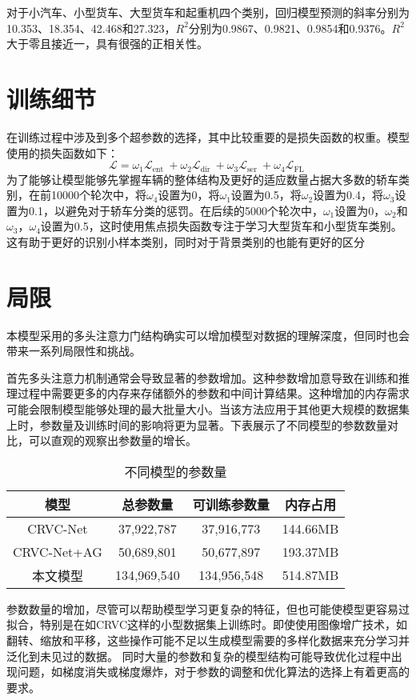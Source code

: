   对于小汽车、小型货车、大型货车和起重机四个类别，回归模型预测的斜率分别为10.353、18.354、42.468和27.323，\(R^2\)分别为0.9867、0.9821、0.9854和0.9376。\(R^2\)大于零且接近一，具有很强的正相关性。

\section{训练细节}
在训练过程中涉及到多个超参数的选择，其中比较重要的是损失函数的权重。模型使用的损失函数如下：
\begin{equation}
    \mathcal{L}=\omega_1\mathcal{L}_{\text {ent }}+\omega_2\mathcal{L}_{\text {dir }}+\omega_3\mathcal{L}_{\text {ser }}
    +\omega_4\mathcal{L}_{\text {FL }}
\end{equation}
为了能够让模型能够先掌握车辆的整体结构及更好的适应数量占据大多数的轿车类别，在前10000个轮次中，将\(\omega_4\)设置为0，将\(\omega_1\)设置为0.5，将\(\omega_2\)设置为0.4，将\(\omega_3\)设置为0.1，以避免对于轿车分类的惩罚。在后续的5000个轮次中，\(\omega_1\)设置为0，\(\omega_2\)和\(\omega_3\)，\(\omega_4\)设置为0.5，这时使用焦点损失函数专注于学习大型货车和小型货车类别。这有助于更好的识别小样本类别，同时对于背景类别的也能有更好的区分


\section{局限}
本模型采用的多头注意力门结构确实可以增加模型对数据的理解深度，但同时也会带来一系列局限性和挑战。

首先多头注意力机制通常会导致显著的参数增加。这种参数增加意导致在训练和推理过程中需要更多的内存来存储额外的参数和中间计算结果。这种增加的内存需求可能会限制模型能够处理的最大批量大小。当该方法应用于其他更大规模的数据集上时，参数量及训练时间的影响将更为显著。下表展示了不同模型的参数数量对比，可以直观的观察出参数量的增长。
\begin{table}[h]
    \centering
    \caption{不同模型的参数量}
    \label{tab:parma}
    \begin{tabularx}{\textwidth}{CCCC}
      \toprule
      模型 & 总参数量 & 可训练参数量 & 内存占用  \\
      \midrule
    CRVC-Net& 37,922,787  & 37,916,773 & 144.66MB \\
    CRVC-Net+AG& 50,689,801  & 50,677,897 & 193.37MB \\
    本文模型  & 134,969,540    & 134,956,548 & 514.87MB \\   
      \bottomrule
    \end{tabularx}
\end{table}


参数数量的增加，尽管可以帮助模型学习更复杂的特征，但也可能使模型更容易过拟合，特别是在如CRVC这样的小型数据集上训练时。即使使用图像增广技术，如翻转、缩放和平移，这些操作可能不足以生成模型需要的多样化数据来充分学习并泛化到未见过的数据。
同时大量的参数和复杂的模型结构可能导致优化过程中出现问题，如梯度消失或梯度爆炸，对于参数的调整和优化算法的选择上有着更高的要求。





